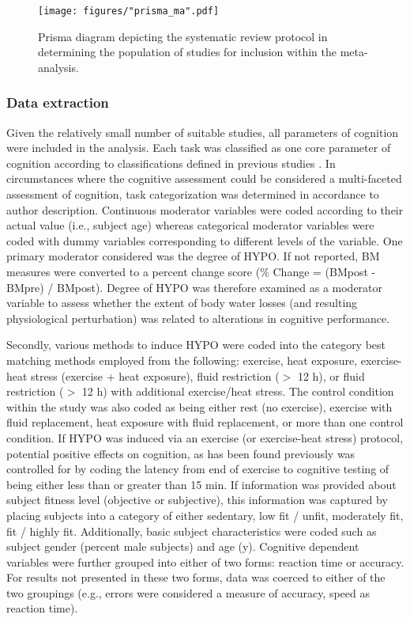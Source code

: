\begin{figure}
  	\centering
  	\texttt{[image: figures/"prisma\_ma".pdf]}
  	\caption{Prisma diagram depicting the systematic review protocol in determining the population of studies for inclusion within the meta-analysis.}
  	\label{fig:prisma}

\end{figure}

\subsubsection{Data extraction}
Given the relatively small number of suitable studies, all parameters of cognition were included in the analysis. Each task was classified as one core parameter of cognition according to classifications defined in previous studies \cite{chang_effects_2012}. In circumstances where the cognitive assessment could be considered a multi-faceted assessment of cognition, task categorization was determined in accordance to author description. Continuous moderator variables were coded according to their actual value (i.e., subject age) whereas categorical moderator variables were coded with dummy variables corresponding to different levels of the variable. One primary moderator considered was the degree of HYPO. If not reported, BM measures were converted to a percent change score (\% Change = (BMpost - BMpre) / BMpost). Degree of HYPO was therefore examined as a moderator variable to assess whether the extent of body water losses (and resulting physiological perturbation) was related to alterations in cognitive performance. 

Secondly, various methods to induce HYPO were coded into the category best matching methods employed from the following: exercise, heat exposure, exercise-heat stress (exercise + heat exposure), fluid restriction (${>}$ 12 h), or fluid restriction (${>}$ 12 h) with additional exercise/heat stress. The control condition within the study was also coded as being either rest (no exercise), exercise with fluid replacement, heat exposure with fluid replacement, or more than one control condition. If HYPO was induced via an exercise (or exercise-heat stress) protocol, potential positive effects on cognition, as has been found previously \cite{chang_effects_2012} was controlled for by coding the latency from end of exercise to cognitive testing of being either less than or greater than 15 min. If information was provided about subject fitness level (objective or subjective), this information was captured by placing subjects into a category of either sedentary, low fit / unfit, moderately fit, fit / highly fit. Additionally, basic subject characteristics were coded such as subject gender (percent male subjects) and age (y). Cognitive dependent variables were further grouped into either of two forms: reaction time or accuracy. For results not presented in these two forms, data was coerced to either of the two groupings (e.g., errors were considered a measure of accuracy, speed as reaction time).       

